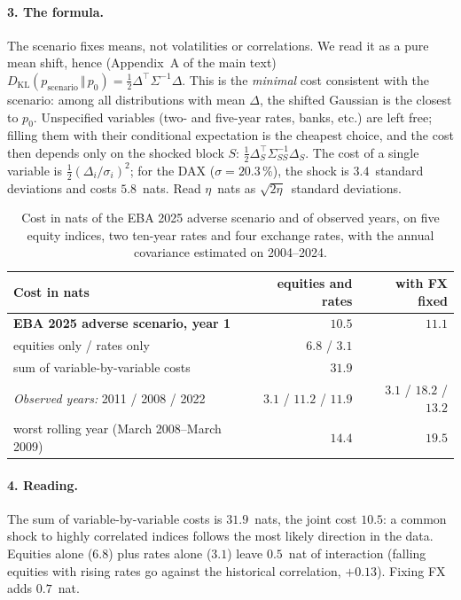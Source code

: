\documentclass[11pt]{article}
\theoremstyle{definition}
\newcommand{\KL}[2]{D_{\mathrm{KL}}\!\left(#1\,\Vert\,#2\right)}
\begin{document}
\paragraph{3. The formula.} The scenario fixes means, not volatilities or
correlations. We read it as a pure mean shift, hence
(Appendix~A of the main text) $\KL{p_{\text{scenario}}}{p_0}=\tfrac12\Delta^\top
\Sigma^{-1}\Delta$. This is the \emph{minimal} cost consistent with the
scenario: among all distributions with mean $\Delta$, the shifted Gaussian is
the closest to $p_0$. Unspecified variables (two- and five-year rates, banks,
etc.) are left free; filling them with their conditional expectation is the
cheapest choice, and the cost then depends only on the shocked block $S$:
$\tfrac12\Delta_S^\top\Sigma_{SS}^{-1}\Delta_S$. The cost of a single variable
is $\tfrac12(\Delta_i/\sigma_i)^2$; for the DAX ($\sigma=20.3\,\%$), the shock
is $3.4$~standard deviations and costs $5.8$~nats. Read $\eta$~nats as
$\sqrt{2\eta}$~standard deviations.

\begin{table}[t]
\centering
\small
\begin{tabular}{@{}lrr@{}}
\toprule
Cost in nats & equities and rates & with FX fixed \\
\midrule
\textbf{EBA 2025 adverse scenario, year 1} & $\mathbf{10.5}$ & $\mathbf{11.1}$ \\
\quad equities only / rates only & $6.8$ / $3.1$ & \\
\quad sum of variable-by-variable costs & $31.9$ & \\
\midrule
\emph{Observed years:} 2011 / 2008 / 2022 & $3.1$ / $11.2$ / $11.9$ & $3.1$ / $18.2$ / $13.2$ \\
\quad worst rolling year (March 2008--March 2009) & $14.4$ & $19.5$ \\
\bottomrule
\end{tabular}
\caption{Cost in nats of the EBA 2025 adverse scenario and of observed years,
on five equity indices, two ten-year rates and four exchange rates, with the
annual covariance estimated on 2004--2024.}
\label{tab:eba}
\end{table}

\paragraph{4. Reading.} The sum of variable-by-variable costs is
$31.9$~nats, the joint cost $10.5$: a common shock to highly correlated indices
follows the most likely direction in the data. Equities alone ($6.8$) plus
rates alone ($3.1$) leave $0.5$~nat of interaction (falling equities with
rising rates go against the historical correlation, $+0.13$). Fixing FX adds
$0.7$~nat.
\end{document}
